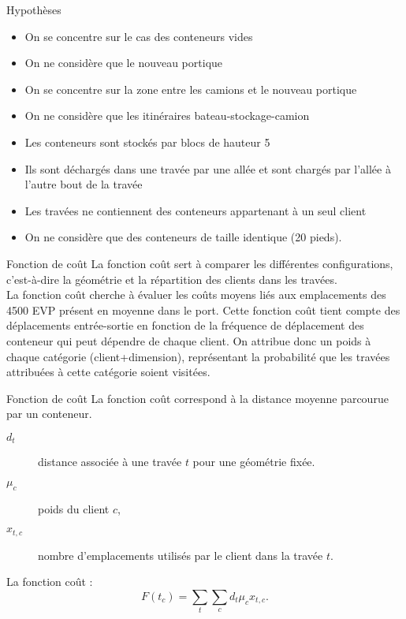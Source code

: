 \begin{frame}{Hypothèses}
  \begin{itemize}
  \item On se concentre sur le cas des conteneurs vides
    \vfill
  \item On ne considère que le nouveau portique
    \vfill
  \item On se concentre sur la zone entre les camions et le nouveau portique
    \vfill
  \item On ne considère que les itinéraires bateau-stockage-camion
    \vfill
  \item Les conteneurs sont stockés par blocs de hauteur 5
    \vfill
  \item Ils sont déchargés dans une travée par une allée et sont chargés par l'allée à l'autre bout de la travée
    \vfill
  \item Les travées ne contiennent des conteneurs appartenant à un seul client
    \vfill
  \item On ne considère que des conteneurs de taille identique (20 pieds).
  \end{itemize}
  \vfill
\end{frame}

\begin{frame}{Fonction de coût}
  \vfill
  La fonction coût sert à comparer les différentes configurations, c'est-à-dire la géométrie et la répartition des clients dans les travées.\\
  \vfill
  La fonction coût cherche à évaluer les coûts moyens liés aux emplacements des 4500 EVP présent en moyenne dans le port.
  Cette fonction coût tient compte des déplacements entrée-sortie en fonction de la fréquence de déplacement des conteneur qui peut dépendre de chaque client.
  \vfill
  On attribue donc un poids à chaque catégorie (client+dimension), représentant la probabilité que les travées attribuées à cette catégorie soient visitées.
\end{frame}

\begin{frame}{Fonction de coût}
  La fonction coût correspond à la distance moyenne parcourue par un conteneur.
  \begin{description}
  \item[$d_t$] distance associée à une travée $t$ pour une géométrie fixée.
  \item[$\mu_c$] poids du client $c$,
  \item[$x_{t,c}$] nombre d'emplacements utilisés par le client dans la travée $t$.
  \end{description}
  \vfill
  La fonction coût  : 
  $$ F(t_c)=\sum_t \sum_c d_t\mu_c x_{t,c}.  $$
  \vfill
\end{frame}

